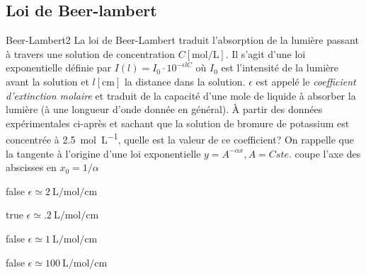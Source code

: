 \documentclass[11pt]{article}
\begin{document}
	\subsection{Loi de Beer-lambert}
		\begin{question}{27}{Beer-Lambert}{2}{}
            La loi de Beer-Lambert traduit l'absorption de la lumière passant à travers une solution de concentration $C[\si{\mole\per\liter}]$. Il s'agit d'une loi exponentielle définie par $I(l) = I_0\cdot 10^{-\epsilon l C}$ où $I_0$ est l'intensité de la lumière avant la solution et  $l[\si{\centi\meter}]$ la distance dans la solution. $\epsilon$ est appelé le \emph{coefficient d'extinction molaire} et traduit de la capacité d'une mole de liquide à absorber la lumière (à une longueur d'onde donnée en général). À partir des données expérimentales ci-après et sachant que la solution de bromure de potassium est concentrée à \SI{2.5}{\mole\per\liter}, quelle est la valeur de ce coefficient? On rappelle que la tangente à l'origine d'une loi exponentielle $y = A^{-\alpha x}, A = Cste.$ coupe l'axe des abscisses en $x_0 = 1/\alpha$
            \begin{figure}
             \end{figure}
        \end{question}
        \begin{reponses}
            \item[false] $\epsilon \simeq \SI{2}{\liter\per\mole\per\centi\meter}$
		    \item[true] $\epsilon \simeq \SI{.2}{\liter\per\mole\per\centi\meter}$
		    \item[false] $\epsilon \simeq \SI{1}{\liter\per\mole\per\centi\meter}$
		    \item[false] $\epsilon \simeq \SI{100}{\liter\per\mole\per\centi\meter}$
		    \end{reponses}
		
\end{document}
